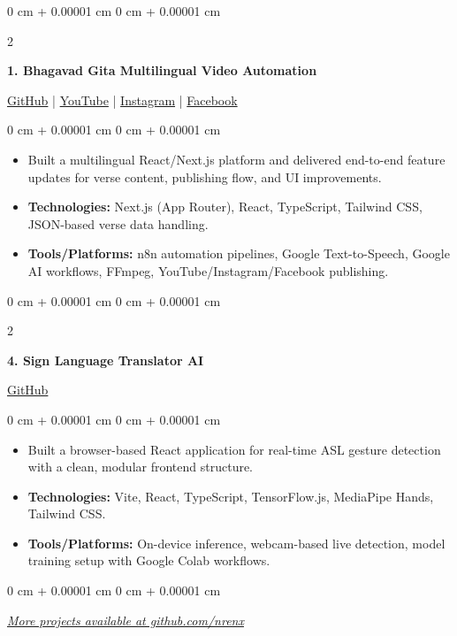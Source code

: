 \documentclass[10pt, a4paper]{article}
\newenvironment{highlights}{
    \begin{itemize}[
        topsep=0.06 cm,
        parsep=0.04 cm,
        partopsep=0pt,
        itemsep=0.02 cm,
        leftmargin=0 cm + 10pt
    ]
}{
    \end{itemize}
}
\newenvironment{onecolentry}{
    \begin{adjustwidth}{
        0 cm + 0.00001 cm
    }{
        0 cm + 0.00001 cm
    }
}{
    \end{adjustwidth}
}
\newenvironment{twocolentry}[2][4.5 cm]{
    \onecolentry
    \def\secondColumn{#2}
    \setcolumnwidth{\fill, #1}
    \begin{paracol}{2}
}{
    \switchcolumn \raggedleft \secondColumn
    \end{paracol}
    \endonecolentry
}
\begin{document}
    \vspace{0.2 cm}

    \begin{twocolentry}[5.8 cm]{
        \small{\href{https://github.com/nrenx/Bhagavad-gita}{GitHub} | \href{https://www.youtube.com/@Gita_Gyanaam/playlists}{YouTube} | \href{https://www.instagram.com/gita_gyanaam/}{Instagram} | \href{https://www.facebook.com/profile.php?id=61577900636828}{Facebook}}
    }
        \textbf{1. Bhagavad Gita Multilingual Video Automation}
    \end{twocolentry}
    \begin{onecolentry}
        \begin{highlights}
            \item Built a multilingual React/Next.js platform and delivered end-to-end feature updates for verse content, publishing flow, and UI improvements.
            \item \textbf{Technologies:} Next.js (App Router), React, TypeScript, Tailwind CSS, JSON-based verse data handling.
            \item \textbf{Tools/Platforms:} n8n automation pipelines, Google Text-to-Speech, Google AI workflows, FFmpeg, YouTube/Instagram/Facebook publishing.
        \end{highlights}
    \end{onecolentry}

    \vspace{0.2 cm}
    \begin{twocolentry}{
        \href{https://github.com/nrenx/Sign-Language-Translator_using_AI-ML}{GitHub}
    }
        \textbf{4. Sign Language Translator AI}
    \end{twocolentry}
    \begin{onecolentry}
        \begin{highlights}
            \item Built a browser-based React application for real-time ASL gesture detection with a clean, modular frontend structure.
            \item \textbf{Technologies:} Vite, React, TypeScript, TensorFlow.js, MediaPipe Hands, Tailwind CSS.
            \item \textbf{Tools/Platforms:} On-device inference, webcam-based live detection, model training setup with Google Colab workflows.
        \end{highlights}
    \end{onecolentry}

    \vspace{0.2 cm}
    \begin{onecolentry}
        \small{\textit{\href{https://github.com/nrenx}{More projects available at github.com/nrenx}}}
    \end{onecolentry}

    \vspace{0.05 cm}
\end{document}
